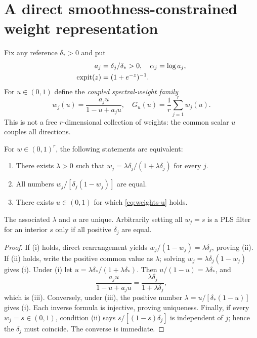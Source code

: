 \section{A direct smoothness-constrained weight representation}\label{sec:weights}

Fix any reference $\delta_*>0$ and put
\[
\begin{aligned}
a_j&=\delta_j/\delta_*>0,\quad\alpha_j=\log a_j,\\
\operatorname{expit}(z)&=(1+e^{-z})^{-1}.
\end{aligned}
\]
For $u\in(0,1)$ define the \emph{coupled spectral-weight family}
\begin{equation}\label{eq:weights-u}
w_j(u)=\frac{a_ju}{1-u+a_ju},\quad
G_u(u)=\frac1r\sum_{j=1}^r w_j(u).
\end{equation}
This is not a free $r$-dimensional collection of weights: the common scalar $u$ couples all directions.

\begin{theorem}\label{thm:odds}
For $w\in(0,1)^r$, the following statements are equivalent:
\begin{enumerate}
\item There exists $\lambda>0$ such that
$w_j=\lambda\delta_j/(1+\lambda\delta_j)$ for every $j$.
\item All numbers $w_j/[\delta_j(1-w_j)]$ are equal.
\item There exists $u\in(0,1)$ for which \eqref{eq:weights-u} holds.
\end{enumerate}
The associated $\lambda$ and $u$ are unique. Arbitrarily setting all $w_j=s$ is a PLS filter for an interior $s$ only if all positive $\delta_j$ are equal.
\end{theorem}
\begin{proof}
If (i) holds, direct rearrangement yields
$w_j/(1-w_j)=\lambda\delta_j$, proving (ii).
If (ii) holds, write the positive common value as $\lambda$;
solving $w_j=\lambda\delta_j(1-w_j)$ gives (i).
Under (i) let $u=\lambda\delta_*/(1+\lambda\delta_*)$.
Then $u/(1-u)=\lambda\delta_*$, and
\[
\frac{a_ju}{1-u+a_ju}
=\frac{\lambda\delta_j}{1+\lambda\delta_j},
\]
which is (iii). Conversely, under (iii), the positive number
$\lambda=u/[\delta_*(1-u)]$ gives (i).
Each inverse formula is injective, proving uniqueness.
Finally, if every $w_j=s\in(0,1)$, condition (ii) says
$s/[(1-s)\delta_j]$ is independent of $j$; hence the $\delta_j$
must coincide. The converse is immediate.
\end{proof}

